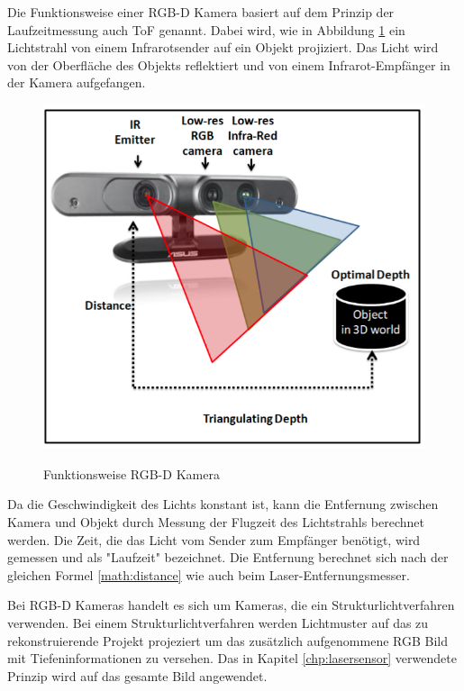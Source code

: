    Die Funktionsweise einer \ac{RGB-D} Kamera basiert auf dem Prinzip der Laufzeitmessung auch \ac{ToF} genannt.  Dabei wird, wie in Abbildung \ref{fig:rgbd} ein Lichtstrahl von einem Infrarotsender auf ein Objekt projiziert. Das Licht wird von der Oberfläche des Objekts reflektiert und von einem Infrarot-Empfänger in der Kamera aufgefangen.

    \begin{figure}
        \includegraphics[width=\textwidth]{./images/rgbd-camera-ref.png}
        \label{fig:rgbd}\caption{Funktionsweise RGB-D Kamera\cite[vgl. ][Abbildung 7]{SWB-165930377X}}
    \end{figure}
    
    Da die Geschwindigkeit des Lichts konstant ist, kann die Entfernung zwischen Kamera und Objekt durch Messung der Flugzeit des Lichtstrahls berechnet werden.
    Die Zeit, die das Licht vom Sender zum Empfänger benötigt, wird gemessen und als "Laufzeit" bezeichnet.
    Die Entfernung berechnet sich nach der gleichen Formel \ref{math:distance} wie auch beim Laser-Entfernungsmesser. 


    Bei \ac{RGB-D} Kameras handelt es sich um Kameras, die ein Strukturlichtverfahren verwenden.
    Bei einem Strukturlichtverfahren werden Lichtmuster auf das zu rekonstruierende Projekt projeziert um das zusätzlich aufgenommene RGB Bild mit Tiefeninformationen zu versehen. Das in Kapitel \ref{chp:lasersensor} verwendete Prinzip wird auf das gesamte Bild angewendet. 
    
